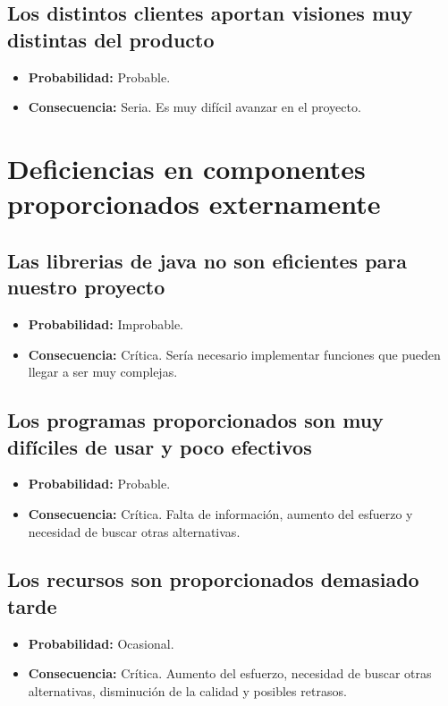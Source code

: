 \documentclass[spanish,a4paper,12pt]{report}	%
\begin{document}
\subsection*{Los distintos clientes aportan visiones muy distintas del producto}	
	\begin{itemize}
		\item \textbf {Probabilidad: }Probable.
		\item \textbf {Consecuencia: }Seria. Es muy difícil avanzar en el proyecto.
	\end{itemize}

%
\section{Deficiencias en componentes proporcionados externamente}

\subsection*{Las librerias de java no son eficientes para nuestro proyecto}	
	\begin{itemize}
		\item \textbf {Probabilidad: }Improbable.
		\item \textbf {Consecuencia: }Crítica. Sería necesario implementar funciones que pueden llegar a ser muy complejas.
	\end{itemize}

\subsection*{Los programas proporcionados son muy difíciles de usar y poco efectivos}	
	\begin{itemize}
		\item \textbf {Probabilidad: }Probable.
		\item \textbf {Consecuencia: }Crítica. Falta de información, aumento del esfuerzo y necesidad de buscar otras alternativas.
	\end{itemize}

\subsection*{Los recursos son proporcionados demasiado tarde}	
	\begin{itemize}
		\item \textbf {Probabilidad: }Ocasional.
		\item \textbf {Consecuencia: }Crítica. Aumento del esfuerzo, necesidad de buscar otras alternativas, disminución de la calidad y posibles retrasos.
	\end{itemize}
\end{document}
